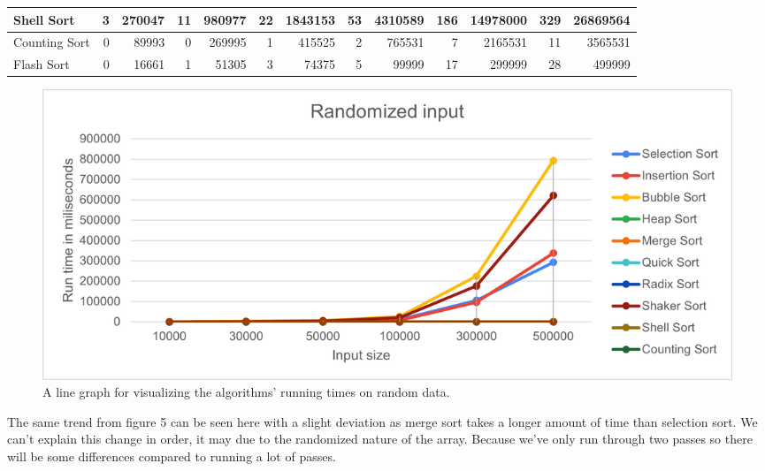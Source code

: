 \documentclass{article}
\newcommand\tab[1][0.5cm]{\hspace*{#1}}
\begin{document}
\begin{table}[H]
\begin{adjustbox}{width=\columnwidth,center}
\begin{tabular}{|l|rrrrrrrrrrrr|}
Shell Sort                         & \multicolumn{1}{r|}{3}            & \multicolumn{1}{r|}{270047}     & \multicolumn{1}{r|}{11}           & \multicolumn{1}{r|}{980977}     & \multicolumn{1}{r|}{22}           & \multicolumn{1}{r|}{1843153}    & \multicolumn{1}{r|}{53}           & \multicolumn{1}{r|}{4310589}    & \multicolumn{1}{r|}{186}          & \multicolumn{1}{r|}{14978000}    & \multicolumn{1}{r|}{329}          & 26869564                        \\ \hline
Counting Sort                      & \multicolumn{1}{r|}{0}            & \multicolumn{1}{r|}{89993}      & \multicolumn{1}{r|}{0}            & \multicolumn{1}{r|}{269995}     & \multicolumn{1}{r|}{1}            & \multicolumn{1}{r|}{415525}     & \multicolumn{1}{r|}{2}            & \multicolumn{1}{r|}{765531}     & \multicolumn{1}{r|}{7}            & \multicolumn{1}{r|}{2165531}     & \multicolumn{1}{r|}{11}           & 3565531                         \\ \hline
Flash Sort                         & \multicolumn{1}{r|}{0}            & \multicolumn{1}{r|}{16661}      & \multicolumn{1}{r|}{1}            & \multicolumn{1}{r|}{51305}      & \multicolumn{1}{r|}{3}            & \multicolumn{1}{r|}{74375}      & \multicolumn{1}{r|}{5}            & \multicolumn{1}{r|}{99999}      & \multicolumn{1}{r|}{17}           & \multicolumn{1}{r|}{299999}      & \multicolumn{1}{r|}{28}           & 499999                          \\ \hline
\end{tabular}
\end{adjustbox}
\end{table}


\begin{figure}[H]
\includegraphics[scale = 0.8]{RandomLines.png}
\caption{ A line graph for visualizing the algorithms’ running times on random data.}
\centering
\end{figure}

\tab The same trend from figure 5 can be seen here with a slight deviation as merge sort takes a longer amount of time than selection sort. We can't explain this change in order, it may due to the randomized nature of the array. Because we've only run through two passes so there will be some differences compared to running a lot of passes.
\end{document}
